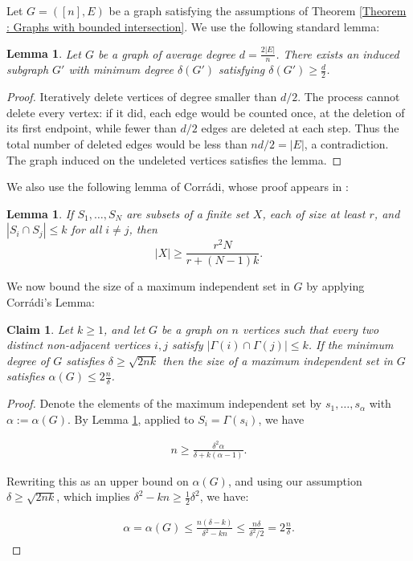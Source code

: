 \documentclass[fullpage,11pt]{article}
\theoremstyle{break}
\newtheorem{lemma}[theorem]{Lemma}
\newtheorem{claim}[theorem]{Claim}
\theoremstyle{definition}
\theoremstyle{break}
\begin{document}
Let $G=([n],E)$ be a graph satisfying the assumptions of Theorem \ref{Theorem : Graphs with bounded intersection}. We use the following standard lemma:

\begin{lemma}\label{Lemma : Pruning Graph}
Let $G$ be a graph of average degree $d=\frac{2|E|}{n}$. There exists an induced subgraph $G'$ with \emph{minimum} degree $\delta(G')$ satisfying $ \delta(G') \geq \frac{d}{2}$.
\end{lemma}

\begin{proof}
    Iteratively delete vertices of degree smaller than $d/2$. The process cannot delete every vertex: if it did, each edge would be counted once, at the deletion of its first endpoint, while fewer than $d/2$ edges are deleted at each step. Thus the total number of deleted edges would be less than $nd/2=|E|$, a contradiction. The graph induced on the undeleted vertices satisfies the lemma.
\end{proof}
\noindent We also use the following lemma of Corrádi, whose proof appears in \cite[Lemma~2.1]{Jukna}:

\begin{lemma}\label{LEMMA : Corradi's Lemma}
If $S_1,\ldots,S_N$ are subsets of a finite set $X$, each of size at least $r$, and $|S_i \cap S_j| \leq k$ for all $i\neq j$, then
\[
    |X| \geq \frac{r^2 N}{r+(N-1)k}.
\]
\end{lemma}
\noindent We now bound the size of a maximum independent set in $G$ by applying Corrádi's Lemma:

\begin{claim} \label{CLAIM : Independent Set Bound}
    Let $k\geq1$, and let $G$ be a graph on $n$ vertices such that every two distinct non-adjacent vertices $i,j$ satisfy $|\Gamma(i) \cap \Gamma(j)| \leq k$. If the minimum degree of $G$ satisfies $\delta \geq \sqrt{2nk}$ then the size of a maximum independent set in $G$ satisfies $\alpha(G) \leq 2 \frac{n}{\delta }$.
\end{claim}

\begin{proof}
    Denote the elements of the maximum independent set by $s_1,\ldots,s_{\alpha}$ with $\alpha:=\alpha(G)$. By Lemma \ref{LEMMA : Corradi's Lemma}, applied to $S_i = \Gamma(s_i)$, we have

    \begin{align*}
        n \geq \frac{\delta^2 \alpha}{\delta+k(\alpha-1)}.
    \end{align*}

    Rewriting this as an upper bound on $\alpha(G)$, and using our assumption $\delta \geq \sqrt{2nk}$, which implies $\delta^2-kn\geq \frac12\delta^2$, we have:

    \begin{align*}
        \alpha=\alpha(G)\leq \frac{n (\delta -k) }{\delta^2-kn} \leq \frac{n \delta}{\delta^2/2} = 2\frac{n}{\delta}.
    \end{align*}
\end{proof}
\end{document}
